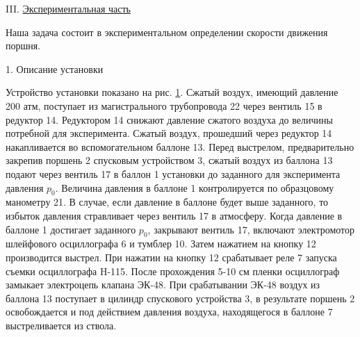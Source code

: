 \documentclass[specialist, subf, href, colorlinks=true, 14pt, final]{disser}
\theoremstyle{definition}
\begin{document}
\noindent III. \underline{Экспериментальная часть}

Наша задача состоит в экспериментальном определении скорости движения поршня.

1. Описание установки

Устройство установки показано на рис. \ref{2-2-3}. Сжатый воздух,  имеющий давление 200 атм, поступает из магистрального трубопровода 22 через вентиль 15 в редуктор 14. Редуктором 14 снижают давление сжатого воздуха до величины потребной для эксперимента. Сжатый воздух, прошедший через редуктор 14 накапливается во вспомогательном баллоне 13. Перед выстрелом, предварительно закрепив поршень 2 спусковым устройством 3, сжатый воздух из баллона 13 подают через вентиль 17 в баллон 1 установки до заданного для эксперимента давления $p_0$. Величина давления в баллоне 1 контролируется по образцовому манометру 21. В случае, если давление в баллоне будет выше заданного, то избыток давления стравливает через вентиль 17 в атмосферу. Когда давление в баллоне 1 достигает заданного $p_0$, закрывают вентиль 17, включают электромотор шлейфового осциллографа 6 и тумблер 10. Затем нажатием на кнопку 12 производится выстрел. При нажатии на кнопку 12 срабатывает реле 7 запуска съемки осциллографа H-115. После прохождения 5-10 см пленки осциллограф замыкает электроцепь клапана ЭК-48. При срабатывании ЭК-48 воздух из баллона 13 поступает в цилиндр спускового устройства 3, в результате поршень 2 освобождается и под действием давления воздуха, находящегося в баллоне 7 выстреливается из ствола.
\begin{figure}[!htp]
  \caption{}
  \label{2-2-3}
\end{figure}
\end{document}
